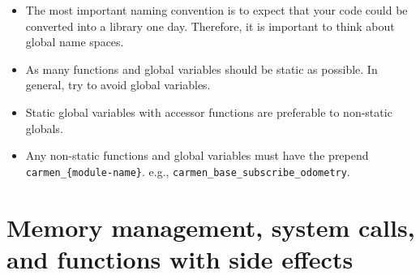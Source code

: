 \documentclass{article}
\begin{document}
\begin{itemize}
  
\item The most important naming convention is to expect that your code could
  be converted into a library one day. Therefore, it is important to think
  about global name spaces.

\item As many functions and global variables should be static as possible. In
general, try to avoid global variables. 

\item Static global variables with accessor functions are preferable to
non-static globals.

\item Any non-static functions and global variables must have the prepend
\verb!carmen_{module-name}!. e.g., \verb!carmen_base_subscribe_odometry!.

\end{itemize}

\section{Memory management, system calls, and functions with side effects}
\end{document}
